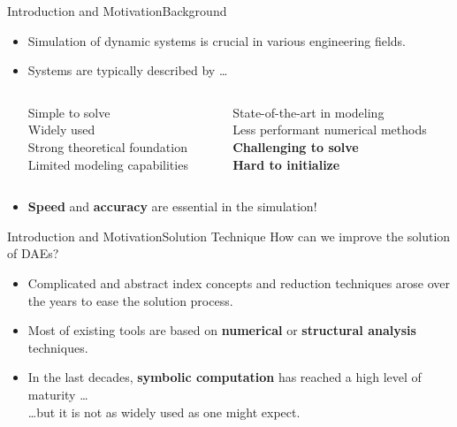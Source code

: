 

\begin{frame}{Introduction and Motivation}{Background}
  \begin{itemize}
    \item Simulation of dynamic systems is crucial in various engineering fields.
    \item Systems are typically described by \dots
    \vspace{1.0em}
    \begin{columns}
      \centering
      \begin{column}[t]{0.45\textwidth}
        \centering
        \centering\small
        Simple to solve \\
        Widely used \\
        Strong theoretical foundation \\
        Limited modeling capabilities
      \end{column}
      \begin{column}[t]{0.45\textwidth}
        \centering
        \centering\small
        State-of-the-art in modeling \\
        Less performant numerical methods \\
        \textbf{Challenging to solve} \\
        \textbf{Hard to initialize}
      \end{column}
    \end{columns}
    \vspace{1.0em}
    \item \textbf{Speed} and \textbf{accuracy} are essential in the simulation!
  \end{itemize}
  \vspace{0.5em}
\end{frame}

\begin{frame}{Introduction and Motivation}{Solution Technique}
  How can we improve the solution of \acp{DAE}?
  \begin{itemize}
    \item Complicated and abstract index concepts and reduction techniques arose over the years to ease the solution process.
    \item Most of existing tools are based on \textbf{numerical} or \textbf{structural analysis} techniques.
    \item In the last decades, \textbf{symbolic computation} has reached a high level of maturity \dots \\
    \dots but it is not as widely used as one might expect.
  \end{itemize}
  \vspace{0.5em}
\end{frame}

